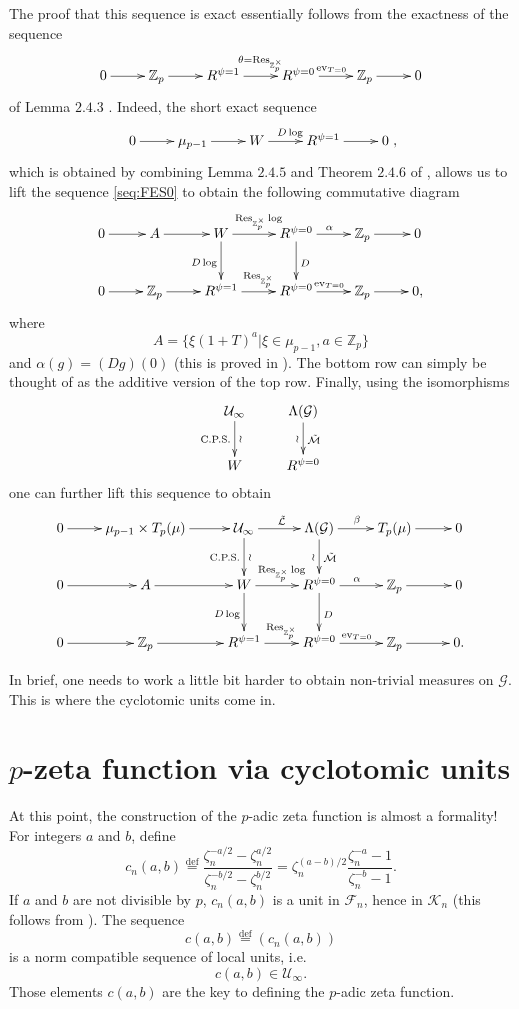 \documentclass[twoside,10pt]{article}
\newcommand{\Z}{\mathbb{Z}}
\newcommand{\curlG}{\mathcal{G}}
\newcommand{\curlF}{\mathcal{F}}
\newcommand{\curlM}{\mathcal{M}}
\newcommand{\curlU}{\mathcal{U}}
\newcommand{\curlK}{\mathcal{K}}
\newcommand{\curlL}{\mathcal{L}}
\newcommand{\eqdef}{\overset{\text{def}}{=}}
\newcommand{\Res}{\text{Res}_{\Z_p^\times}}
\begin{document}
The proof that this sequence is exact essentially follows from the exactness of the sequence
\begin{equation}\label{seq:FES0}
\xymatrix{
	0\ar[r]	&\Z_p\ar[r]	&R^{\psi=1}\ar[r]^{\theta=\Res}	&R^{\psi=0}\ar[r]^{\text{ev}_{T=0}}	&\Z_p\ar[r]	&0
}
\end{equation}
of Lemma $2.4.3$ \cite{CS}. Indeed, the short exact sequence
\[\xymatrix{0\ar[r]	&\mu_{p-1}\ar[r]	&W\ar[r]^{D\log}	& R^{\psi=1}\ar[r]	&0},\]
which is obtained by combining Lemma $2.4.5$ and Theorem $2.4.6$ of \cite{CS}, allows us to lift the sequence \ref{seq:FES0} to obtain the following commutative diagram
\[\xymatrix{
	0\ar[r]	&A\ar[r]	&W\ar[r]^{\Res\log}\ar[d]_{D\log}&R^{\psi=0}\ar[r]^{\alpha}\ar[d]^{D}		&\Z_p\ar[r]	&0\\
	0\ar[r]	&\Z_p\ar[r]	&R^{\psi=1}\ar[r]^{\Res}	&R^{\psi=0}\ar[r]^{\text{ev}_{T=0}}	&\Z_p\ar[r]	&0,
}\]
where
\[A=\{\xi(1+T)^a|\xi\in\mu_{p-1},a\in\Z_p\}\]
and $\alpha(g)=(Dg)(0)$ (this is proved in \cite[Theorem 2.5.2]{CS}). The bottom row can simply be thought of as the additive version of the top row. Finally, using the isomorphisms
\[\xymatrix{
	\curlU_\infty\ar[d]_{\text{C.P.S.}}^{\wr}	&\Lambda(\curlG)\ar[d]_{\wr}^{\tilde{\curlM}}\\
	W	&R^{\psi=0}\\
}\]
one can further lift this sequence to obtain
\[\xymatrix{
	0\ar[r]	&\mu_{p-1}\times T_p(\mu)\ar[r]	&\curlU_\infty\ar[r]^{\tilde{\curlL}}\ar[d]_{\text{C.P.S.}}^{\wr}	&\Lambda(\curlG)\ar[r]^\beta\ar[d]_{\wr}^{\tilde{\curlM}}	&T_p(\mu)\ar[r]	&0\\
	0\ar[r]	&A\ar[r]	&W\ar[r]^{\Res\log}\ar[d]_{D\log}&R^{\psi=0}\ar[r]^{\alpha}\ar[d]^{D}		&\Z_p\ar[r]	&0\\
	0\ar[r]	&\Z_p\ar[r]	&R^{\psi=1}\ar[r]^{\Res}	&R^{\psi=0}\ar[r]^{\text{ev}_{T=0}}	&\Z_p\ar[r]	&0.
}\]

In brief, one needs to work a little bit harder to obtain non-trivial measures on $\curlG$. This is where the cyclotomic units come in.

\section{$p$-zeta function via cyclotomic units}
At this point, the construction of the $p$-adic zeta function is almost a formality! For integers $a$ and $b$, define
\[c_n(a,b)\eqdef\frac{\zeta_n^{-a/2}-\zeta_n^{a/2}}{\zeta_n^{-b/2}-\zeta_n^{b/2}}=\zeta_n^{(a-b)/2}\frac{\zeta_n^{-a}-1}{\zeta_n^{-b}-1}.\]
If $a$ and $b$ are not divisible by $p$, $c_n(a,b)$ is a unit in $\curlF_n$, hence in $\curlK_n$ (this follows from \cite[Proposition 6.2(c)]{Mi}). The sequence
\[c(a,b)\eqdef(c_n(a,b))\]
is a norm compatible sequence of local units, i.e.
\[c(a,b)\in\curlU_\infty.\]
Those elements $c(a,b)$ are the key to defining the $p$-adic zeta function.
\end{document}
